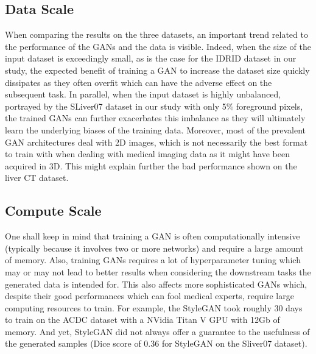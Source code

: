 \documentclass[preprint,12pt, authoryear]{elsarticle}
\begin{document}
\subsection{Data Scale}
When comparing the results on the three datasets, an important trend related to the performance of the GANs and the data is visible. Indeed, when the size of the input dataset is exceedingly small, as is the case for the IDRID dataset in our study, the expected benefit of training a GAN to increase the dataset size quickly dissipates as they often overfit which can have the adverse effect on the subsequent task. 
In parallel, when the input dataset is highly unbalanced, portrayed by the SLiver07 dataset in our study with only 5\% foreground pixels, the trained GANs can further exacerbates this imbalance as they will ultimately learn the underlying biases of the training data. Moreover, most of the prevalent GAN architectures deal with 2D images, which is not necessarily the best format to train with when dealing with medical imaging data as it might have been acquired in 3D. This might explain further the bad performance shown on the liver CT dataset.

\subsection{Compute Scale}
One shall keep in mind that training a GAN is often computationally intensive (typically because it involves two or more networks) and require a large amount of memory.  Also, training GANs requires a lot of hyperparameter tuning which may or may not lead to better results  when considering the downstream tasks the generated data is intended for. This also affects more sophisticated GANs which, despite their good performances which can fool medical experts, require large computing resources to train. For example, the StyleGAN took roughly 30 days to train on the ACDC dataset with a NVidia Titan V GPU with 12Gb of memory.  And yet, StyleGAN did not always offer a guarantee to the usefulness of the generated samples (Dice score of 0.36 for StyleGAN on the Sliver07 dataset).
\end{document}
